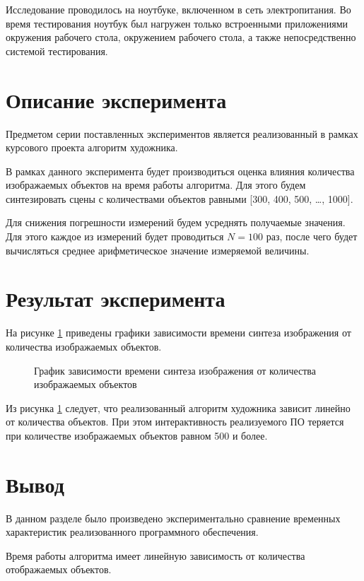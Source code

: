 Исследование проводилось на ноутбуке, включенном в сеть электропитания. Во время тестирования ноутбук был нагружен только встроенными приложениями окружения рабочего стола, окружением рабочего стола, а также непосредственно системой тестирования.

\section{Описание эксперимента}
Предметом серии поставленных экспериментов является реализованный в рамках курсового проекта алгоритм художника.

В рамках данного эксперимента будет производиться оценка влияния количества изображаемых объектов на время работы алгоритма. Для этого будем синтезировать сцены с количествами объектов равными [300, 400, 500, \dots, 1000].
 
Для снижения погрешности измерений будем усреднять получаемые значения. Для этого каждое из измерений будет проводиться $N = 100$ раз, после чего будет вычисляться среднее арифметическое значение измеряемой величины.

\section{Результат эксперимента}

На рисунке \ref{plt:time} приведены графики зависимости времени синтеза изображения от количества изображаемых объектов.

\begin{figure}[ht]
	\centering
	\captionsetup{justification=centering}
	\caption{График зависимости времени синтеза изображения от количества изображаемых объектов}
	\label{plt:time}
\end{figure}

Из рисунка \ref{plt:time} следует, что реализованный алгоритм художника зависит линейно от количества объектов. При этом интерактивность реализуемого ПО теряется при количестве изображаемых объектов равном 500 и более.  

\section{Вывод}

В данном разделе было произведено экспериментально сравнение временных характеристик реализованного программного обеспечения.

Время работы алгоритма имеет линейную зависимость от количества отображаемых объектов.
